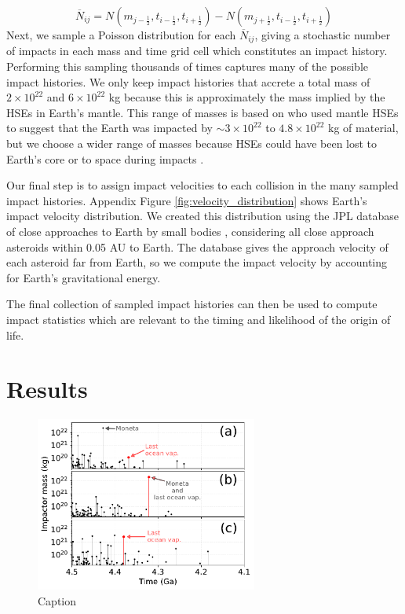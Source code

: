 \documentclass[preprint]{aastex63}
\begin{document}
\begin{equation}
  \overline{N}_{ij} = N(m_{j-\frac{1}{2}},t_{i-\frac{1}{2}},t_{i+\frac{1}{2}}) - N(m_{j+\frac{1}{2}},t_{i-\frac{1}{2}},t_{i+\frac{1}{2}})
\end{equation}
Next, we sample a Poisson distribution for each $\overline{N}_{ij}$, giving a stochastic number of impacts in each mass and time grid cell which constitutes an impact history. Performing this sampling thousands of times captures many of the possible impact histories. We only keep impact histories that accrete a total mass of $2 \times 10^{22}$ and $6 \times 10^{22}$ kg because this is approximately the mass implied by the HSEs in Earth's mantle. This range of masses is based on \citet{Day_2015} who used mantle HSEs to suggest that the Earth was impacted by $\sim 3 \times 10^{22}$ to $4.8 \times 10^{22}$ kg of material, but we choose a wider range of masses because HSEs could have been lost to Earth's core or to space during impacts \citep{Marchi_2018}.

Our final step is to assign impact velocities to each collision in the many sampled impact histories. Appendix Figure \ref{fig:velocity_distribution} shows Earth's impact velocity distribution. We created this distribution using the JPL database of close approaches to Earth by small bodies \citep{Park_2023}, considering all close approach asteroids within 0.05 AU to Earth. The database gives the approach velocity of each asteroid far from Earth, so we compute the impact velocity by accounting for Earth's gravitational energy.

The final collection of sampled impact histories can then be used to compute impact statistics which are relevant to the timing and likelihood of the origin of life.

\section{Results}

\begin{figure}
  \centering
  \includegraphics[width=0.65\textwidth]{figures/example_impact_histories.pdf}
  \caption{Caption}
  \label{fig:example_impact_histories}
\end{figure}
\end{document}
